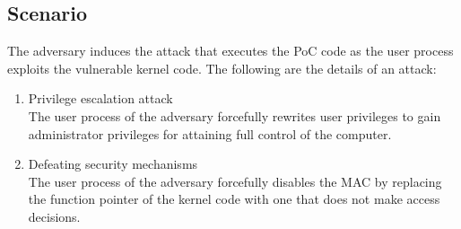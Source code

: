 \subsection{Scenario} \label{subsection:attack_scenario}
The adversary induces the attack that executes the PoC code as the user
process exploits the vulnerable kernel code. 
%
The following are the details of an attack:
%

\begin{enumerate}[topsep=0pt]%
  \item Privilege escalation attack\\
    The user process of the adversary forcefully rewrites user privileges to
    gain administrator privileges for attaining full control of the computer.
  \item Defeating security mechanisms\\
    The user process of the adversary forcefully disables the MAC by replacing the
    function pointer of the kernel code with one that does not make access
    decisions.

  
\end{enumerate}





